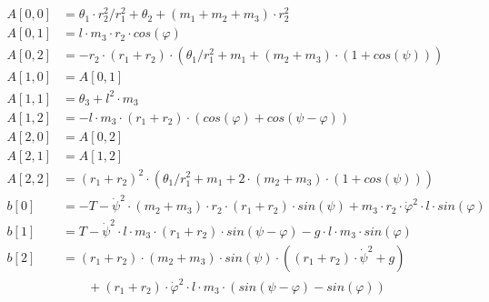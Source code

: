 \documentclass{article}
\begin{document}
\begin{align*}
A[0,0] &= \theta_1 \cdot r_2^2/r_1^2 + \theta_2 + (m_1 + m_2 + m_3) \cdot r_2^2 \\
A[0,1] &= l \cdot m_3 \cdot r_2 \cdot cos(\varphi) \\
A[0,2] &= -r_2 \cdot (r_1 + r_2) \cdot (\theta_1/r_1^2  + m_1 + (m_2+m_3) \cdot (1+cos(\psi)))\\
A[1,0] &= A[0,1] \\
A[1,1] &= \theta_3 + l^2 \cdot m_3 \\
A[1,2] &= -l \cdot m_3 \cdot (r_1 + r_2) \cdot (cos(\varphi) + cos(\psi - \varphi)) \\
A[2,0] &= A[0,2] \\
A[2,1] &= A[1,2] \\
A[2,2] &= (r_1 + r_2)^2 \cdot (\theta_1/r_1^2 + m_1 + 2 \cdot (m_2+m_3) \cdot (1+cos(\psi))) \\
b[0] &= -T - \dot{\psi}^2 \cdot (m_2+m_3) \cdot r_2 \cdot (r_1 + r_2) \cdot sin(\psi) + m_3 \cdot r_2 \cdot  \dot{\varphi}^2 \cdot l \cdot sin(\varphi) \\
b[1] &= T - \dot{\psi}^2 \cdot l \cdot m_3 \cdot (r_1+r_2) \cdot sin(\psi - \varphi) - g \cdot l \cdot m_3 \cdot sin(\varphi) \\
b[2] &= (r_1 + r_2) \cdot (m_2+m_3) \cdot sin(\psi) \cdot ((r_1 + r_2) \cdot \dot{\psi}^2 + g) \\
&\qquad +(r_1 + r_2) \cdot \dot{\varphi}^2 \cdot l \cdot m_3 \cdot (sin(\psi - \varphi)-sin(\varphi)) \\
\end{align*}
\end{document}
